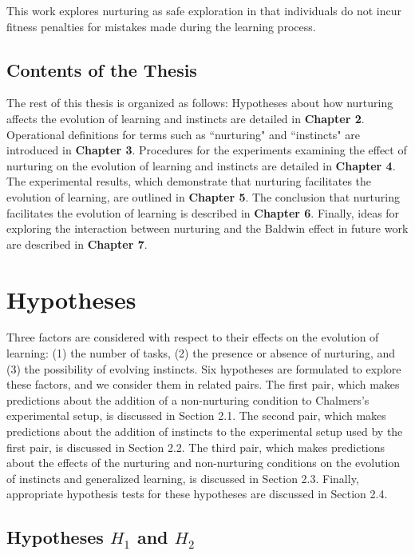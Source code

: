 \documentclass[master]{outhesis}
\begin{document}
This work explores nurturing as safe exploration in that individuals do not incur fitness penalties for mistakes made during the learning process.

\section{Contents of the Thesis}

The rest of this thesis is organized as follows:
Hypotheses about how nurturing affects the evolution of learning and instincts are detailed in \textbf{Chapter 2}. 
Operational definitions for terms such as ``nurturing" and ``instincts" are introduced in \textbf{Chapter 3}.
Procedures for the experiments examining the effect of nurturing on the evolution of learning and instincts are detailed in \textbf{Chapter 4}.
The experimental results, which demonstrate that nurturing facilitates the evolution of learning, are outlined in \textbf{Chapter 5}. 
The conclusion that nurturing facilitates the evolution of learning is described in \textbf{Chapter 6}. 
Finally, ideas for exploring the interaction between nurturing and the Baldwin effect in future work are described in \textbf{Chapter 7}.

\chapter{Hypotheses}

Three factors are considered with respect to their effects on the evolution of learning:
(1) the number of tasks,
(2) the presence or absence of nurturing, and
(3) the possibility of evolving instincts.
Six hypotheses are formulated to explore these factors,
and we consider them in related pairs.
The first pair, which makes predictions about the addition of a non-nurturing condition to Chalmers's experimental setup, is discussed in Section 2.1.
The second pair, which makes predictions about the addition of instincts to the experimental setup used by the first pair, is discussed in Section 2.2.
The third pair, which makes predictions about the effects of the nurturing and non-nurturing conditions on the evolution of instincts and generalized learning, is discussed in Section 2.3.
Finally, appropriate hypothesis tests for these hypotheses are discussed in Section 2.4.

\section{Hypotheses $H_1$ and $H_2$}
\end{document}
